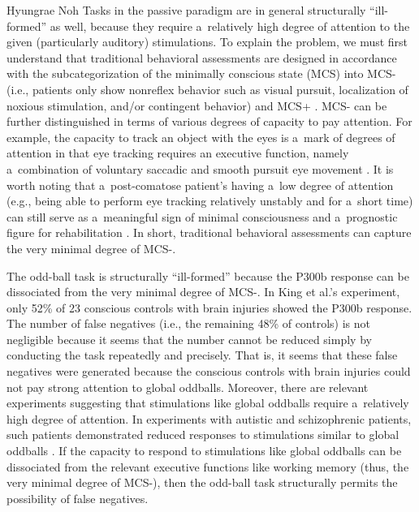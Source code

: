 \begin{artengenv}{Hyungrae Noh}
Tasks in the passive paradigm are in general structurally ``ill-formed'' as well, because they require a~relatively high degree of attention to the given (particularly auditory) stimulations. To explain the problem, we must first understand that traditional behavioral assessments are designed in accordance with the subcategorization of the minimally conscious state (MCS) into MCS- (i.e., patients only show nonreflex behavior such as visual pursuit, localization of noxious stimulation, and/or contingent behavior) and MCS+
\parencite[i.e., patients show command following][p.1087]{bruno_functional_2012}. %
 MCS- can be further distinguished in terms of various degrees of capacity to pay attention. For example, the capacity to track an object with the eyes is a~mark of degrees of attention in that eye tracking requires an executive function, namely a~combination of voluntary saccadic and smooth pursuit eye movement 
\parencite[][]{ansell_visual_1995}. %
 It is worth noting that a~post-comatose patient's having a~low degree of attention (e.g., being able to perform eye tracking relatively unstably and for a~short time) can still serve as a~meaningful sign of minimal consciousness and a~prognostic figure for rehabilitation 
\parencite[][]{ansell_slow--recover_1993}. %
 In short, traditional behavioral assessments can capture the very minimal degree of MCS-.

The odd-ball task is structurally ``ill-formed'' because the P300b response can be dissociated from the very minimal degree of MCS-. In King et al.'s
\parencite*[][]{king_single-trial_2013} %
 experiment, only 52\% of 23 conscious controls with brain injuries showed the P300b response. The number of false negatives (i.e., the remaining 48\% of controls) is not negligible because it seems that the number cannot be reduced simply by conducting the task repeatedly and precisely. That is, it seems that these false negatives were generated because the conscious controls with brain injuries could not pay strong attention to global oddballs. Moreover, there are relevant experiments suggesting that stimulations like global oddballs require a~relatively high degree of attention. In experiments with autistic and schizophrenic patients, such patients demonstrated reduced responses to stimulations similar to global oddballs 
\parencites[][]{novick_electrophysiologic_1980}[][]{kargel_effect_2016}. %
 If the capacity to respond to stimulations like global oddballs can be dissociated from the relevant executive functions like working memory (thus, the very minimal degree of MCS-), then the odd-ball task structurally permits the possibility of false negatives.


\end{artengenv}

